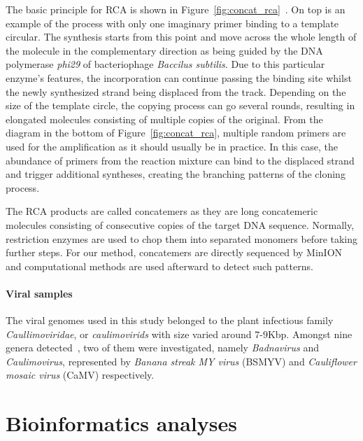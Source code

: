 The basic principle for RCA is shown in Figure~\ref{fig:concat_rca}~\cite{Johne2009rca}.
On top is an example of the process with only one imaginary primer binding to a template circular. The synthesis starts from this point and move across the whole length of the molecule in the complementary direction as being guided by the DNA polymerase  \emph{phi29} of bacteriophage \emph{Baccilus subtilis}.
Due to this particular enzyme's features, the incorporation can continue passing the binding site whilst the newly synthesized strand being displaced from the track.
Depending on the size of the template circle, the copying process can go several rounds, resulting in elongated molecules consisting of multiple copies of the original.
From the diagram in the bottom of Figure~\ref{fig:concat_rca}, multiple random primers are used for the amplification as it should usually be in practice. In this case, the abundance of primers from the reaction mixture can bind to the displaced strand and trigger additional syntheses, creating the branching patterns of the cloning process.

The RCA products are called concatemers as they are long concatemeric molecules consisting of consecutive copies of the target DNA sequence. Normally, restriction enzymes are used to chop them into separated monomers before taking further steps. For our method, concatemers are directly sequenced by MinION and computational methods are used afterward to detect such patterns.
\paragraph{Viral samples}
The viral genomes used in this study belonged to the plant infectious family \emph{Caullimoviridae}, or \emph{caulimovirids} with size varied around $7$-$9$Kbp.
Amongst nine genera detected~\cite{Geering2010ST,Mollov2013LZ}, two of them were investigated, namely \emph{Badnavirus} and \emph{Caulimovirus}, represented by \emph{Banana streak MY virus} (BSMYV) and \emph{Cauliflower mosaic virus} (CaMV) respectively.

\section{Bioinformatics analyses}
